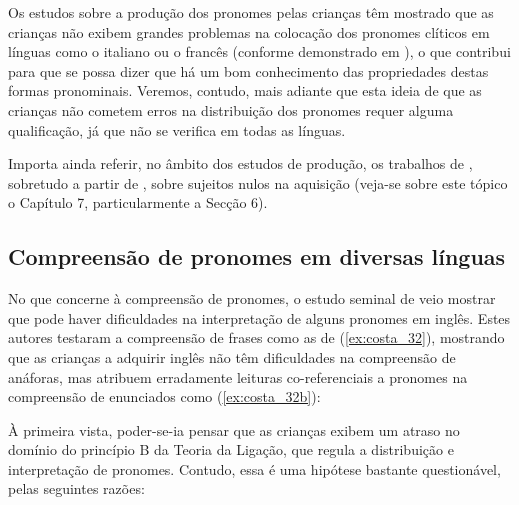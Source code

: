 \documentclass[output=paper]{LSP/langsci}
\begin{document}
Os estudos sobre a produção dos pronomes pelas crianças têm mostrado que as crianças não exibem grandes problemas na colocação dos pronomes clíticos em línguas como o italiano ou o francês (conforme demonstrado em \citealt{guasti2002}), o que contribui para que se possa dizer que há um bom conhecimento das propriedades destas formas pronominais. Veremos, contudo, mais adiante que esta ideia de que as crianças não cometem erros na distribuição dos pronomes requer alguma qualificação, já que não se verifica em todas as línguas.

Importa ainda referir, no âmbito dos estudos de produção, os trabalhos de \citeauthor{hyams1992genesis}, sobretudo a partir de \citeyear{hyams1992genesis}, sobre sujeitos nulos na aquisição (veja-se sobre este tópico o Capítulo 7, particularmente a Secção 6).


\subsection{Compreensão de pronomes em diversas línguas}
\label{subsec:costa_compreensao_linguas}

No que concerne à compreensão de pronomes, o estudo seminal de \citet{chienwexler1990} veio mostrar que pode haver dificuldades na interpretação de alguns pronomes em inglês. Estes autores testaram a compreensão de frases como as de (\ref{ex:costa_32}), mostrando que as crianças a adquirir inglês não têm dificuldades na compreensão de anáforas, mas atribuem erradamente leituras co-referenciais a pronomes na compreensão de enunciados como (\ref{ex:costa_32b}):

\ea\label{ex:costa_32}
\zl

À primeira vista, poder-se-ia pensar que as crianças exibem um atraso no domínio do princípio B da Teoria da Ligação, que regula a distribuição e interpretação de pronomes. Contudo, essa é uma hipótese bastante questionável, pelas seguintes razões:
\end{document}
